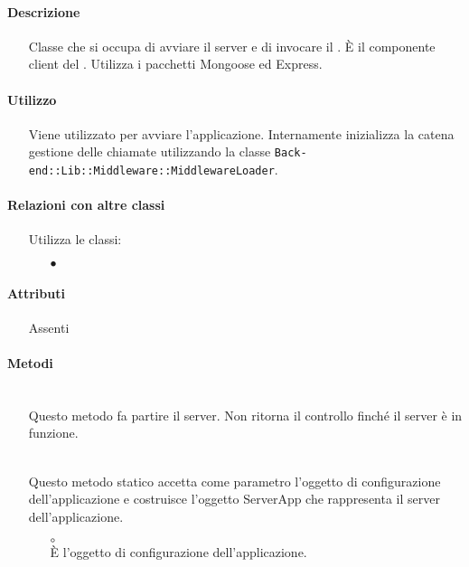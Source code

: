 \paragraph*{Descrizione}
\begin{itemize}
\item[] Classe che si occupa di avviare il server e di invocare il . È il componente client del  . Utilizza i pacchetti Mongoose ed Express.
\end{itemize}

\paragraph*{Utilizzo}
\begin{itemize}
\item[] Viene utilizzato per avviare l'applicazione. Internamente inizializza la catena gestione delle chiamate utilizzando la classe \texttt{Back-end::Lib::Middleware::MiddlewareLoader}.
\end{itemize}

\paragraph*{Relazioni con altre classi}
\begin{itemize}


\item[] Utilizza le classi:
\begin{itemize}
\item[$\bullet$] 
\end{itemize}
\end{itemize}

\paragraph*{Attributi}
\begin{itemize}
\item[] Assenti
\end{itemize}

\paragraph*{Metodi}
\begin{itemize}
\item[]  \\ Questo metodo fa partire il server. Non ritorna il controllo finché il server è in funzione.
\item[]  \\ Questo metodo statico accetta come parametro l'oggetto di configurazione dell'applicazione e costruisce l'oggetto ServerApp che rappresenta il server dell'applicazione.
\begin{itemize}\addtolength{\itemsep}{-0.5\baselineskip}
\item[$\circ$]  \\ È l'oggetto di configurazione dell'applicazione.
\end{itemize}
\end{itemize}

